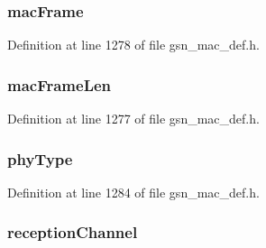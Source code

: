 \hypertarget{a00110_a0a3d7bf8e6b1539749ee8032ddd7af80}{
\subsubsection[{macFrame}]{ {\bf macFrame}}}
\label{a00110_a0a3d7bf8e6b1539749ee8032ddd7af80}


Definition at line 1278 of file gsn\_\-mac\_\-def.h.

\hypertarget{a00110_ac3acb956519f881e356ab23af1a6aa07}{
\subsubsection[{macFrameLen}]{ {\bf macFrameLen}}}
\label{a00110_ac3acb956519f881e356ab23af1a6aa07}


Definition at line 1277 of file gsn\_\-mac\_\-def.h.

\hypertarget{a00110_af9a21f0a566cd662139f84bfaf75d662}{
\subsubsection[{phyType}]{ {\bf phyType}}}
\label{a00110_af9a21f0a566cd662139f84bfaf75d662}


Definition at line 1284 of file gsn\_\-mac\_\-def.h.

\hypertarget{a00110_a12d3c6638df41c42f00fc435666a4dda}{
\subsubsection[{receptionChannel}]{ {\bf receptionChannel}}}
\label{a00110_a12d3c6638df41c42f00fc435666a4dda}


